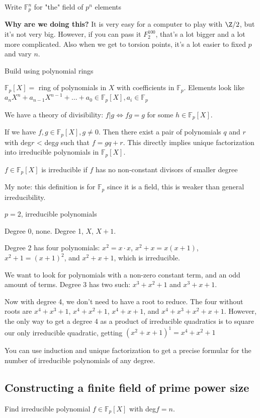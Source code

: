 \documentclass[twoside, 10pt]{article}
\newcommand{\F}{\mathbb{F}}
\begin{document}
Write $\F_p^n$ for "the" field of $p^n$ elements

\textbf{Why are we doing this?} It is very easy for a computer to play with $\Z/2$, but it's not very big. However, if you can pass it $F_2^{100}$, that's a lot bigger and a lot more complicated. Also when we get to torsion points, it's a lot easier to fixed $p$ and vary $n$.

\begin{exm*}
    Build using polynomial rings 
\end{exm*}
$\F_p[X]=$ ring of polynomials in $X$ with coefficients in $\F_p$. Elements look like $a_nX^n + a_{n-1}X^{n-1} + \ldots + a_0 \in \F_p[X], a_i \in \F_p$

We have a theory of divisibility: $f | g \iff fg = g$ for some $h \in \F_p[X]$. 

If we have $f, g \in \F_p[X], g\neq 0$. Then there exist a pair of polynomials $q$ and $r$ with deg$r$ < deg$g$ such that $f = gq + r$. This directly implies unique factorization into irreducible polynomials in $\F_p[X]$. 

\begin{defn}
    $f\in \F_p[X]$ is irreducible if $f$ has no non-constant divisors of smaller degree
\end{defn}
My note: this definition is for $\F_p$ since it is a field, this is weaker than general irreducibility.

\begin{exm*}
    $p = 2$, irreducible polynomials
\end{exm*}
Degree 0, none. Degree 1, $X$, $X+1$.

Degree 2 has four polynomials: $x^2 = x\cdot x$, $x^2 + x = x(x + 1)$, $x^2 + 1 = (x+1)^2$, and $x^2 + x + 1$, which is irreducible. 

We want to look for polynomials with a non-zero constant term, and an odd amount of terms. Degree 3 has two such: $x^3 + x^2 + 1$ and $x^3 + x + 1$.

Now with degree 4, we don't need to have a root to reduce. The four without roots are $x^4 + x^3 + 1$, $x^4 + x^2 + 1$, $x^4 + x + 1$, and $x^4 + x^3 + x^2 + x + 1$. However, the only way to get a degree 4 as a product of irreducible quadratics is to square our only irreducible quadratic, getting $(x^2 + x + 1)^1 = x^4 + x^2 + 1$

You can use induction and unique factorization to get a precise formular for the number of irreducible polynomials of any degree.

\subsection{Constructing a finite field of prime power size} Find irreducible polynomial $f\in \F_p[X]$ with deg$f = n$.
\end{document}
